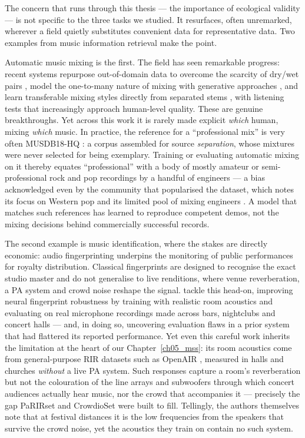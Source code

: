 The concern that runs through this thesis --- the importance of ecological
validity --- is not specific to the three tasks we studied. It resurfaces, often
unremarked, wherever a field quietly substitutes convenient data for
representative data. Two examples from music information retrieval make the point.

Automatic music mixing is the first. The field has seen remarkable progress:
recent systems repurpose out-of-domain data to overcome the scarcity of dry/wet
pairs \citep{martinez2022automatic}, model the one-to-many nature of mixing with
generative approaches \citep{moliner2026automatic}, and learn transferable mixing
styles directly from separated stems \citep{cheng2026stemfx}, with listening
tests that increasingly approach human-level quality. These are genuine
breakthroughs. Yet across this work it is rarely made explicit \emph{which}
human, mixing \emph{which} music. In practice, the reference for a
``professional mix'' is very often MUSDB18-HQ \citep{rafii2019musdbhq}: a corpus
assembled for source \emph{separation}, whose mixtures were never selected for
being exemplary. Training or evaluating automatic mixing on it thereby equates
``professional'' with a body of mostly amateur or semi-professional rock and pop
recordings by a handful of engineers --- a bias acknowledged even by the community
that popularised the dataset, which notes its focus on Western pop and its
limited pool of mixing engineers \citep{fabbro2024sound}. A model that matches
such references has learned to reproduce competent demos, not the mixing
decisions behind commercially successful records.

\vspace{0.5cm}

The second example is music identification, where the stakes are directly
economic: audio fingerprinting underpins the monitoring of public performances
for royalty distribution. Classical fingerprints are designed to recognise the
exact studio master and do not generalise to live renditions, where venue
reverberation, a \acrshort{PA} system and crowd noise reshape the signal.
\citet{araz2025enhancing} tackle this head-on, improving neural fingerprint
robustness by training with realistic room acoustics and evaluating on real
microphone recordings made across bars, nightclubs and concert halls --- and, in
doing so, uncovering evaluation flaws in a prior system that had flattered its
reported performance. Yet even this careful work inherits the limitation at the
heart of our Chapter~\ref{ch05_mss}: its room acoustics come from general-purpose
\acrshort{RIR} datasets such as OpenAIR \citep{murphy2010openair}, measured in
halls and churches \emph{without} a live \acrshort{PA} system. Such responses
capture a room's reverberation but not the colouration of the line arrays and
subwoofers through which concert audiences actually hear music, nor the crowd
that accompanies it --- precisely the gap PaRIRset and CrowdioSet were built to
fill. Tellingly, the authors themselves note that at festival distances it is the
low frequencies from the speakers that survive the crowd noise, yet the acoustics
they train on contain no such system.

